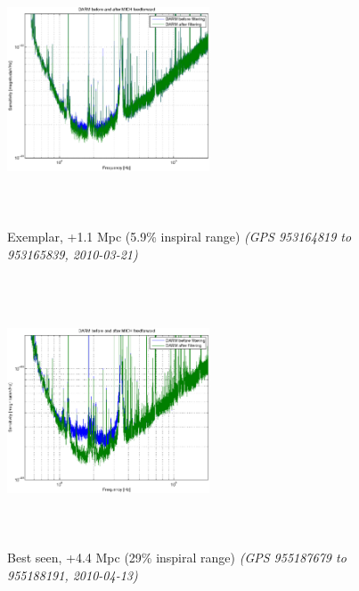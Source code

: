 \begin{figure}
\includegraphics[height=80mm, width=60mm]{clip-exemplar-ASD.eps}
\caption{Exemplar, +1.1 Mpc (5.9\% inspiral range)
\textit{(GPS 953164819 to 953165839, 2010-03-21)}}
\end{figure}
\begin{figure}
\includegraphics[height=80mm, width=60mm]{title_spectrum.eps}
\caption{Best seen, +4.4 Mpc (29\% inspiral range)
\textit{(GPS 955187679 to 955188191, 2010-04-13)}}
\end{figure}
